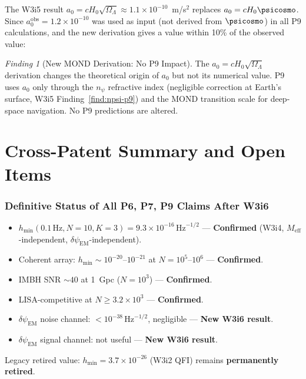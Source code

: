 \documentclass[11pt]{article}
\theoremstyle{definition}
\theoremstyle{remark}
\newtheorem{finding}[theorem]{Finding}
\newcommand{\ee}[1]{\times10^{#1}}
\newcommand{\Meff}{M_{\mathrm{eff}}}
\newcommand{\sqrtHz}{\,\mathrm{Hz}^{-1/2}}
\newcommand{\dpsiem}{\delta\psi_{\mathrm{EM}}}
\begin{document}
The W3i5 result $a_0 = cH_0\sqrt{\Omega_\Lambda} \approx 1.1\ee{-10}$~m/s$^2$
replaces $a_0 = cH_0\psicosmo$. Since $a_0^{\mathrm{obs}} = 1.2\ee{-10}$
was used as input (not derived from $\psicosmo$) in all P9 calculations,
and the new derivation gives a value within 10\% of the observed value:

\begin{finding}[New MOND Derivation: No P9 Impact]
\label{finding:P9-MOND}
The $a_0 = cH_0\sqrt{\Omega_\Lambda}$ derivation changes the theoretical
origin of $a_0$ but not its numerical value. P9 uses $a_0$ only through
the $n_\psi$ refractive index (negligible correction at Earth's surface,
W3i5 Finding~\ref*{find:npsi-p9}) and the MOND transition scale for
deep-space navigation. No P9 predictions are altered.
\end{finding}

\part{Cross-Patent Summary and Open Items}
\label{part:summary}

\section{Definitive Status of All P6, P7, P9 Claims After W3i6}
\label{sec:status}

\begin{tcolorbox}[colback=green!5!white, colframe=green!40!black,
  title=\textbf{P6 (Sensors): All Claims Confirmed}]
\begin{itemize}[nosep]
\item $h_{\min}(0.1\,\mathrm{Hz}, N=10, K=3) = 9.3\ee{-16}\sqrtHz$
  --- \textbf{Confirmed} (W3i4, $\Meff$-independent, $\dpsiem$-independent).
\item Coherent array: $h_{\min} \sim 10^{-20}$--$10^{-21}$ at $N = 10^5$--$10^6$
  --- \textbf{Confirmed}.
\item IMBH SNR $\sim 40$ at 1~Gpc ($N = 10^3$) --- \textbf{Confirmed}.
\item LISA-competitive at $N \geq 3.2\ee{3}$ --- \textbf{Confirmed}.
\item $\dpsiem$ noise channel: $< 10^{-38}\sqrtHz$, negligible --- \textbf{New W3i6 result}.
\item $\dpsiem$ signal channel: not useful --- \textbf{New W3i6 result}.
\end{itemize}
Legacy retired value: $h_{\min} = 3.7\ee{-26}$ (W3i2 QFI) remains
\textbf{permanently retired}.
\end{tcolorbox}
\end{document}
